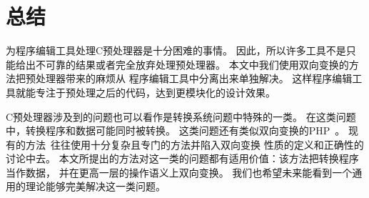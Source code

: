 \chapter{总结}
\label{sec:conclusion}

为程序编辑工具处理C预处理器是十分困难的事情。
因此，所以许多工具不是只能给出不可靠的结果或者完全放弃处理预处理器。
本文中我们使用双向变换的方法把预处理器带来的麻烦从
程序编辑工具中分离出来单独解决。
这样程序编辑工具就能专注于预处理之后的代码，达到更模块化的设计效果。

C预处理器涉及到的问题也可以看作是转换系统问题中特殊的一类。
在这类问题中，转换程序和数据可能同时被转换。
这类问题还有类似双向变换的PHP~\parencite{wang2012automating}。
现有的方法~\parencite{wang2012automating}往往使用十分复杂且专门的方法并陷入双向变换
性质的定义和正确性的讨论中去。
本文所提出的方法对这一类的问题都有适用价值：该方法把转换程序当作数据，
并在更高一层的操作语义上双向变换。
我们也希望未来能看到一个通用的理论能够完美解决这一类问题。



